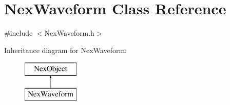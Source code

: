 \hypertarget{class_nex_waveform}{\section{Nex\+Waveform Class Reference}
\label{class_nex_waveform}
}


{\ttfamily \#include $<$Nex\+Waveform.\+h$>$}

Inheritance diagram for Nex\+Waveform\+:\begin{figure}[H]
\begin{center}
\leavevmode
\includegraphics[height=2.000000cm]{class_nex_waveform}
\end{center}
\end{figure}
